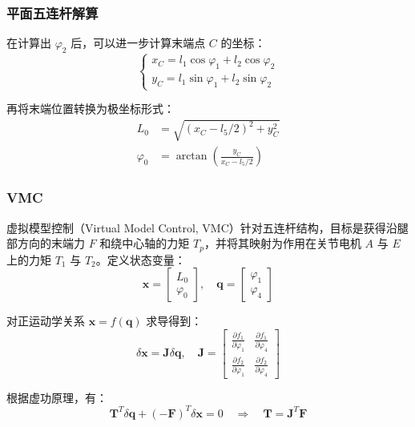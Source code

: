 \documentclass{beamer}
\begin{document}
	
	\begin{frame}
		\frametitle{平面五连杆解算}
			在计算出 $\varphi_2$ 后，可以进一步计算末端点 $C$ 的坐标：
			\begin{equation*}
				\begin{cases}
					x_C = l_1 \cos\varphi_1 + l_2 \cos\varphi_2 \\
					y_C = l_1 \sin\varphi_1 + l_2 \sin\varphi_2
				\end{cases}
			\end{equation*}
			
			再将末端位置转换为极坐标形式：
			\begin{align*}
				L_0 &= \sqrt{(x_C - l_5/2)^2 + y_C^2} \\
				\varphi_0 &= \arctan\left(\frac{y_C}{x_C - l_5/2}\right)
			\end{align*}
	\end{frame}
	
	
	\begin{frame}
		\frametitle{VMC}
		虚拟模型控制（Virtual Model Control, VMC）针对五连杆结构，目标是获得沿腿部方向的末端力 $F$ 和绕中心轴的力矩 $T_p$，并将其映射为作用在关节电机 $A$ 与 $E$ 上的力矩 $T_1$ 与 $T_2$。定义状态变量：
		\begin{equation*}
			\mathbf{x} = \begin{bmatrix} L_0 \\ \varphi_0 \end{bmatrix}, \quad
			\mathbf{q} = \begin{bmatrix} \varphi_1 \\ \varphi_4 \end{bmatrix}
		\end{equation*}
		
		对正运动学关系 $\mathbf{x} = f(\mathbf{q})$ 求导得到：
		\begin{equation*}
			\delta \mathbf{x} = \mathbf{J} \delta \mathbf{q}, \quad \mathbf{J} = \begin{bmatrix} \frac{\partial f_1}{\partial \varphi_1} & \frac{\partial f_1}{\partial \varphi_4} \\ \frac{\partial f_2}{\partial \varphi_1} & \frac{\partial f_2}{\partial \varphi_4} \end{bmatrix}
		\end{equation*}
		
		根据虚功原理，有：
		\begin{equation*}
			\mathbf{T}^T \delta \mathbf{q} + (-\mathbf{F})^T \delta \mathbf{x} = 0 \quad \Rightarrow \quad \mathbf{T} = \mathbf{J}^T \mathbf{F}
		\end{equation*}
	\end{frame}
	
\end{document}
